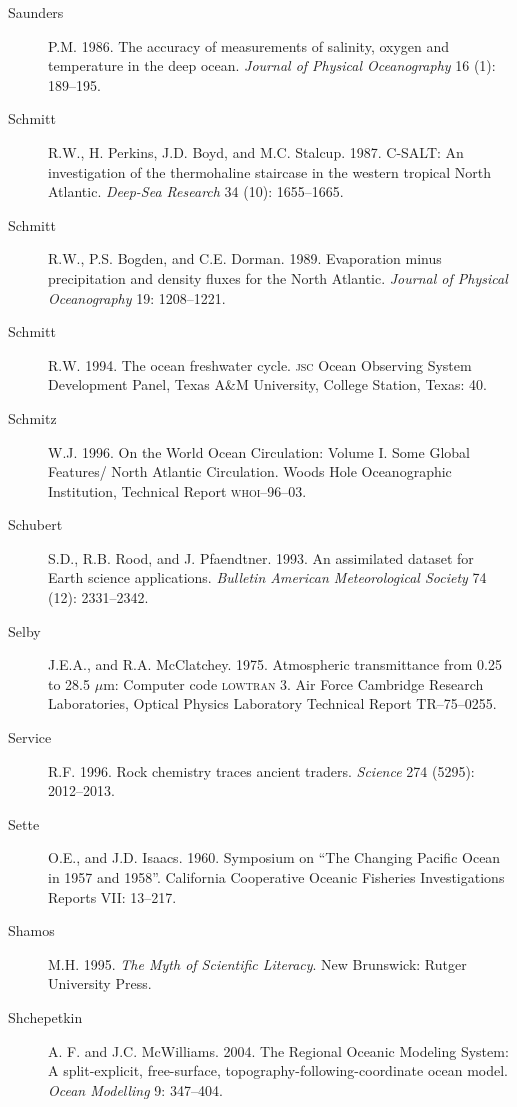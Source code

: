 \begin{description}
\item [Saunders]P.M. 1986. The accuracy of measurements of salinity, oxygen and
temperature in the deep ocean. \textit{Journal of Physical Oceanography} 16 (1): 189--195.

\item [Schmitt]R.W., H. Perkins, J.D. Boyd, and M.C. Stalcup. 1987. C-SALT: An
investigation of the thermohaline staircase in the western tropical North
Atlantic. \textit{Deep-Sea Research} 34 (10): 1655--1665.

\item [Schmitt]R.W., P.S. Bogden, and C.E. Dorman. 1989. Evaporation
minus precipitation and density fluxes for the North Atlantic. \textit{Journal of Physical Oceanography} 19: 1208--1221.

\item [Schmitt]R.W. 1994. The ocean freshwater cycle. \textsc{jsc} Ocean Observing
System Development Panel, Texas A\&M University, College Station, Texas: 40.

\item [Schmitz]W.J. 1996. On the World Ocean Circulation: Volume I. Some Global
Features/ North Atlantic Circulation. Woods Hole Oceanographic Institution,
Technical Report \textsc{whoi}--96--03.

\item [Schubert]S.D., R.B. Rood, and J. Pfaendtner. 1993. An assimilated
dataset for Earth science applications. \textit{Bulletin American Meteorological
Society} 74 (12): 2331--2342.

\item [Selby]J.E.A., and R.A. McClatchey. 1975. Atmospheric transmittance from 0.25 to 28.5 $\mu$m: Computer code \textsc{lowtran} 3. Air Force Cambridge Research Laboratories, Optical Physics Laboratory Technical Report TR--75--0255.

\item [Service]R.F. 1996. Rock chemistry traces ancient traders. \textit{Science} 274 (5295): 2012--2013.

\item[Sette]O.E., and J.D. Isaacs. 1960. Symposium on ``The Changing Pacific Ocean in 1957 and 1958''. California Cooperative Oceanic Fisheries Investigations Reports VII: 13--217.

\item [Shamos]M.H. 1995. \textit{The Myth of Scientific Literacy}. New Brunswick:
Rutger  University Press.

\item [Shchepetkin]A. F. and J.C. McWilliams. 2004. The Regional Oceanic Modeling System: A split-explicit, free-surface, topography-following-coordinate ocean model. \textit{Ocean Modelling} 9: 347--404.


\end{description}
